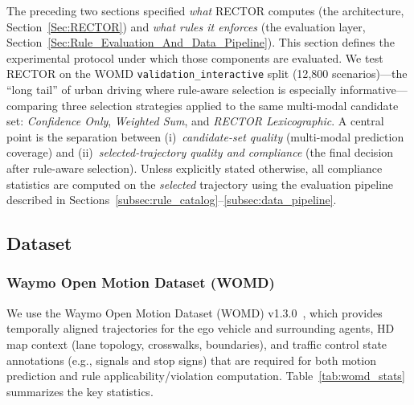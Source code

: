 The preceding two sections specified \emph{what} RECTOR computes (the architecture, Section~\ref{Sec:RECTOR}) and \emph{what rules it enforces} (the evaluation layer, Section~\ref{Sec:Rule_Evaluation_And_Data_Pipeline}). This section defines the experimental protocol under which those components are evaluated.  We test RECTOR on the WOMD \texttt{validation\_interactive} split (12{,}800 scenarios)---the ``long tail'' of urban driving where rule-aware selection is especially informative---comparing three selection strategies applied to the same multi-modal candidate set: \emph{Confidence Only}, \emph{Weighted Sum}, and \emph{RECTOR Lexicographic}.  A central point is the separation between (i)~\emph{candidate-set quality} (multi-modal prediction coverage) and (ii)~\emph{selected-trajectory quality and compliance} (the final decision after rule-aware selection). Unless explicitly stated otherwise, all compliance statistics are computed on the \emph{selected} trajectory using the evaluation pipeline described in Sections~\ref{subsec:rule_catalog}--\ref{subsec:data_pipeline}. 
\subsection{Dataset}
\label{subsec:dataset}

\subsubsection{Waymo Open Motion Dataset (WOMD)}

We use the Waymo Open Motion Dataset (WOMD) v1.3.0~\cite{WOMD_20201}, which provides temporally aligned trajectories for the ego vehicle and surrounding agents, HD map context (lane topology, crosswalks, boundaries), and traffic control state annotations (e.g., signals and stop signs) that are required for both motion prediction and rule applicability/violation computation. Table~\ref{tab:womd_stats} summarizes the key statistics.

